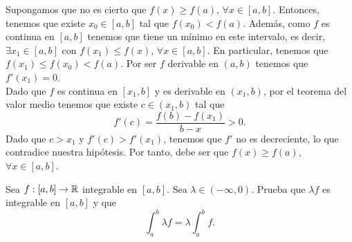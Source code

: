 \documentclass{article}
\begin{document}
\begin{sol}
	Supongamos que no es cierto que $\displaystyle f\left(x\right) \geq f\left(a\right) $, $\displaystyle \forall x \in \left[a,b\right]  $. Entonces, tenemos que existe $\displaystyle x_{0} \in \left[a,b\right]  $ tal que $\displaystyle f\left(x_{0}\right) < f\left(a\right) $. Además, como $\displaystyle f $ es continua en $\displaystyle \left[a,b\right]  $ tenemos que tiene un mínimo en este intervalo, es decir, $\displaystyle \exists x_{1} \in \left[a,b\right]  $ con $\displaystyle f\left(x_{1}\right) \leq f\left(x\right) $, $\displaystyle \forall x\in \left[a,b\right]  $. En particular, tenemos que $\displaystyle f\left(x_{1}\right) \leq f\left(x_{0}\right)< f\left(a\right) $.
Por ser $\displaystyle f $ derivable en $\displaystyle \left(a,b\right) $ tenemos que $\displaystyle f'\left(x_{1}\right) = 0 $. \\
Dado que $\displaystyle f $ es continua en $\displaystyle \left[x_{1}, b\right]  $ y es derivable en $\displaystyle \left(x_{1}, b\right) $, por el teorema del valor medio tenemos que existe $\displaystyle c \in \left(x_{1}, b\right) $ tal que 
\[f'\left(c\right) = \frac{f\left(b\right)-f\left(x_{1}\right)}{b-x} > 0 .\]
Dado que $\displaystyle c > x_{1} $ y $\displaystyle f'\left(c\right) > f'\left(x_{1}\right) $, tenemos que $\displaystyle f' $ no es decreciente, lo que contradice nuestra hipótesis. Por tanto, debe ser que $\displaystyle f\left(x\right) \geq f\left(a\right)$, $\displaystyle \forall x \in \left[a,b\right]  $.
\end{sol}
\begin{ej}
	Sea $\displaystyle f : \left[a,b\right] \to \mathbb{R} $ integrable en $\displaystyle \left[a,b\right]  $. Sea $\displaystyle \lambda \in \left(-\infty, 0\right) $. Prueba que $\displaystyle \lambda f $ es integrable en $\displaystyle \left[a,b\right]  $ y que 
	\[\int^{b}_{a} \lambda f = \lambda \int^{b}_{a} f .\]
\end{ej}
\end{document}
